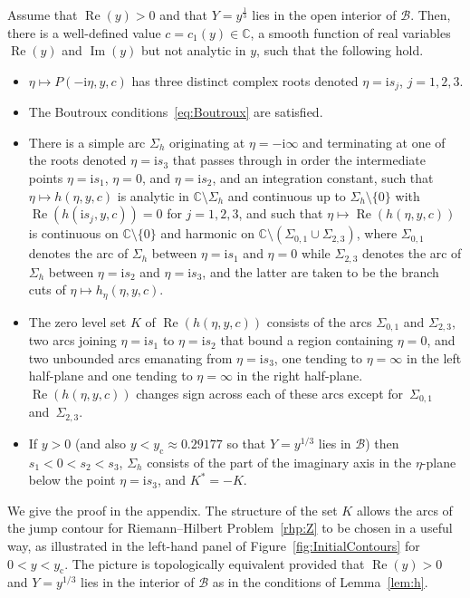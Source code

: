 \begin{Lemma}\label{lem:h}
Assume that $\operatorname{Re}(y)>0$ and that $Y=y^\frac{1}{3}$ lies in the open interior of $\mathcal{B}$. Then, there is a well-defined value $c=c_1(y)\in\mathbb{C}$, a smooth function of real variables $\operatorname{Re}(y)$ and $\operatorname{Im}(y)$ but not analytic in $y$, such that the
following hold.
\begin{itemize}\itemsep=0pt
\item $\eta\mapsto P(-\mathrm{i}\eta,y,c)$ has three distinct complex roots denoted $\eta=\mathrm{i} s_j$, $j=1,2,3$.
\item The Boutroux conditions~\eqref{eq:Boutroux} are satisfied.
\item There is a simple arc $\Sigma_h$ originating at $\eta=-\mathrm{i}\infty$ and terminating at one of the roots denoted $\eta=\mathrm{i} s_3$ that passes through in order the intermediate points $\eta=\mathrm{i} s_1$, $\eta=0$, and $\eta=\mathrm{i} s_2$, and an integration constant, such that $\eta\mapsto h(\eta,y,c)$ is analytic in $\mathbb{C}\setminus\Sigma_h$ and continuous up to $\Sigma_h\setminus\{0\}$
with
$\operatorname{Re}(h(\mathrm{i} s_j,y,c))=0$ for $j=1,2,3$, and such that $\eta\mapsto \operatorname{Re}(h(\eta,y,c))$ is continuous on $\mathbb{C}\setminus\{0\}$ and harmonic on $\mathbb{C}\setminus (\Sigma_{0,1}\cup\Sigma_{2,3})$, where $\Sigma_{0,1}$ denotes the arc of $\Sigma_h$ between $\eta=\mathrm{i} s_1$ and $\eta=0$ while $\Sigma_{2,3}$ denotes the arc of $\Sigma_h$ between $\eta=\mathrm{i} s_2$ and $\eta=\mathrm{i} s_3$, and the latter are taken to be the branch cuts of $\eta\mapsto h_\eta(\eta,y,c)$.
\item The zero level set $K$ of $\operatorname{Re}(h(\eta,y,c))$ consists of the arcs $\Sigma_{0,1}$ and $\Sigma_{2,3}$, two arcs joining $\eta=\mathrm{i} s_1$ to $\eta=\mathrm{i} s_2$ that bound a region containing $\eta=0$, and two unbounded arcs emanating from $\eta=\mathrm{i} s_3$, one tending to $\eta=\infty$ in the left half-plane and one tending to $\eta=\infty$ in the right half-plane. $\operatorname{Re}(h(\eta,y,c))$ changes sign across each of these arcs except for~$\Sigma_{0,1}$ and~$\Sigma_{2,3}$.
\item If $y>0$ \big(and also $y<y_\mathrm{c}\approx 0.29177$ so that $Y=y^{1/3}$ lies in $\mathcal{B}$\big) then $s_1<0<s_2<s_3$, $\Sigma_h$ consists of the part of the imaginary axis in the $\eta$-plane below the point $\eta=\mathrm{i} s_3$, and $K^*=-K$.
\end{itemize}
\end{Lemma}
We give the proof in the appendix. The structure of the set $K$ allows the arcs of the jump contour for Riemann--Hilbert Problem~\ref{rhp:Z} to be chosen in a useful way, as illustrated in the left-hand panel of Figure~\ref{fig:InitialContours} for $0<y<y_\mathrm{c}$.
The picture is topologically equivalent provided that $\operatorname{Re}(y)>0$ and $Y=y^{1/3}$ lies in the interior of $\mathcal{B}$ as in the conditions of Lemma~\ref{lem:h}.

